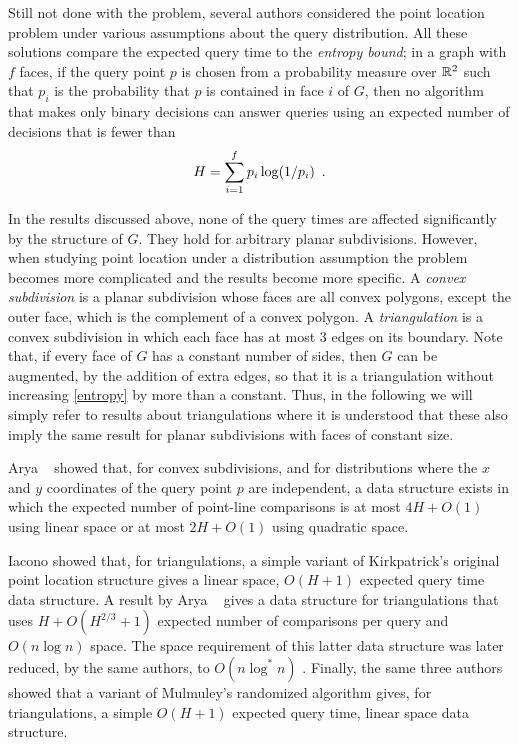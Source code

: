 \documentclass[charterfonts,lotsofwhite]{patmorin}
\begin{document}
Still not done with the problem, several authors considered the point
location problem under various assumptions about the query
distribution.  All these solutions compare the expected query time to
the \emph{entropy bound};  in a graph with $f$ faces, if the query
point $p$ is chosen from a probability measure over $\mathbb{R}^2$ such that
$p_i$ is the probability that $p$ is contained in face $i$ of $G$,
then no algorithm that makes only binary decisions can answer queries
using an expected number of decisions that is fewer than 
\begin{equation}
    H = \sum_{i=1}^f p_i\log(1/p_i) \enspace . \eqlabel{entropy}
\end{equation}

In the results discussed above, none of the query times are affected
significantly by the structure of $G$.  They hold for arbitrary planar
subdivisions.  However, when studying point location under a
distribution assumption the problem becomes more complicated and the
results become more specific.  A \emph{convex subdivision} is a planar
subdivision whose faces are all convex polygons, except the outer
face, which is the complement of a convex polygon.  A
\emph{triangulation} is a convex subdivision in which each face has at
most 3 edges on its boundary.  Note that, if every face of $G$ has a
constant number of sides, then $G$ can be augmented, by the addition
of extra edges, so that it is a triangulation without increasing
\eqref{entropy} by more than a constant.  Thus, in the following we
will simply refer to results about triangulations where it is
understood that these also imply the same result for planar
subdivisions with faces of constant size.

Arya \etal\ \cite{acmr00} showed that, for convex subdivisions, and for
distributions where the $x$ and $y$ coordinates of the query point $p$ are
independent, a data structure exists in which the expected number of
point-line comparisons is at most $4H+O(1)$ using linear space or at
most $2H+O(1)$ using quadratic space.

Iacono \cite{i01,i04} showed that, for triangulations, a simple
variant of Kirkpatrick's original point location structure gives a
linear space, $O(H+1)$ expected query time data structure.  A result
by Arya \etal\ \cite{amm00} gives a data structure for triangulations
that uses $H + O(H^{2/3}+1)$ expected number of comparisons per query
and $O(n\log n)$ space.  The space requirement of this latter
data structure was later reduced, by the same authors, to $O(n\log^* n)$
\cite{amm01a}.  Finally, the same three authors \cite{amm01b} showed
that a variant of Mulmuley's randomized algorithm gives, for
triangulations, a simple $O(H+1)$ expected query time, linear space
data structure.
\end{document}
